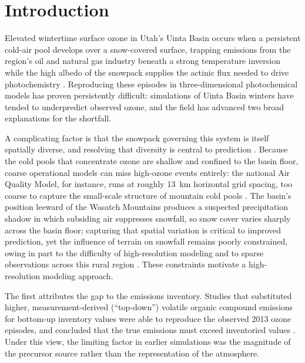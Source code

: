 \documentclass[air,article,submit,pdftex,moreauthors]{Definitions/mdpi}
\begin{document}
\section{Introduction}

Elevated wintertime surface ozone in Utah's Uinta Basin occurs when a
persistent cold-air pool develops over a snow-covered surface, trapping
emissions from the region's oil and natural gas industry beneath a strong
temperature inversion while the high albedo of the snowpack supplies the
actinic flux needed to drive photochemistry \citep{davies2025snowshadow}.
Reproducing these episodes in three-dimensional photochemical models has
proven persistently difficult: simulations of Uinta Basin winters have
tended to underpredict observed ozone, and the field has advanced two
broad explanations for the shortfall.

A complicating factor is that the snowpack governing this system is itself
spatially diverse, and resolving that diversity is central to
prediction \citep{davies2025snowshadow}. Because the cold pools that
concentrate ozone are shallow and confined to the basin floor, coarse
operational models can miss high-ozone events entirely: the national Air
Quality Model, for instance, runs at roughly 13~km horizontal grid spacing,
too coarse to capture the small-scale structure of mountain cold pools
\citep{davies2025snowshadow}. The basin's position leeward of the Wasatch
Mountains produces a suspected precipitation shadow in which subsiding air suppresses
snowfall, so snow cover varies sharply across the basin floor; capturing
that spatial variation is critical to improved prediction, yet the influence
of terrain on snowfall remains poorly constrained, owing in part to the
difficulty of high-resolution modeling and to sparse observations across
this rural region \citep{davies2025snowshadow}. These constraints motivate a
high-resolution modeling approach.

The first attributes the gap to the emissions inventory. Studies that
substituted higher, measurement-derived (``top-down'') volatile organic
compound emissions for bottom-up inventory values were able to reproduce
the observed 2013 ozone episodes, and concluded that the true emissions
must exceed inventoried values \citep{ahmadov2015,matichuk2017}. Under this
view, the limiting factor in earlier simulations was the magnitude of the
precursor source rather than the representation of the atmosphere.
\end{document}
